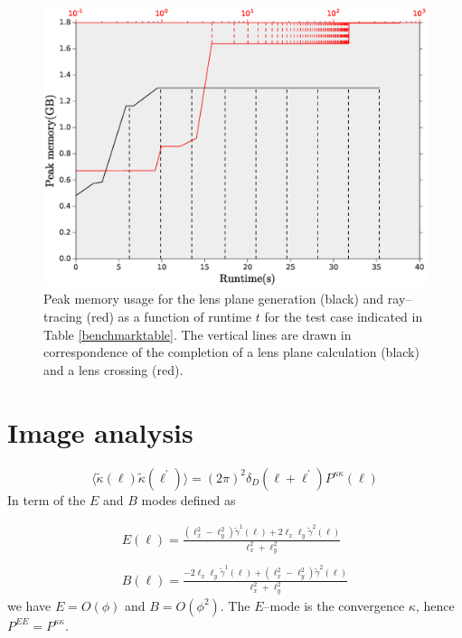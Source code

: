 \documentclass[reprint,aps,prd,superscriptaddress,showkeys,showpacs]{revtex4-1}
\begin{document}
\begin{figure}
\includegraphics[scale=0.3]{Figures/memory_usage.eps}
\caption{Peak memory usage for the lens plane generation (black) and ray--tracing (red) as a function of runtime $t$ for the test case indicated in Table \ref{benchmarktable}. The vertical lines are drawn in correspondence of the completion of a lens plane calculation (black) and a lens crossing (red).}
\label{memoryfig}
\end{figure}


\section{Image analysis}
%

\begin{equation}
\langle\tilde{\kappa}(\pmb{\ell})\tilde{\kappa}(\pmb{\ell}^\prime)\rangle = (2\pi)^2\delta_D(\pmb{\ell}+\pmb{\ell}^\prime)P^{\kappa\kappa}(\ell)
\end{equation}
%
In term of the $E$ and $B$ modes defined as

\begin{equation}
\label{ebmodeeqs}
\begin{matrix}
E(\pmb{\ell}) = \frac{(\ell_x^2-\ell_y^2)\tilde{\gamma}^1(\pmb{\ell})+2\ell_x\ell_y\tilde{\gamma}^2(\pmb{\ell})}{\ell_x^2+\ell_y^2}  \\ \\
B(\pmb{\ell}) = \frac{-2\ell_x\ell_y\tilde{\gamma}^1(\pmb{\ell})+(\ell_x^2-\ell_y^2)\tilde{\gamma}^2(\pmb{\ell})}{\ell_x^2+\ell_y^2}
\end{matrix}
\end{equation}
%
we have $E=O(\phi)$ and $B=O(\phi^2)$. The $E$--mode is the convergence $\kappa$, hence $P^{EE}=P^{\kappa\kappa}$.  
\end{document}
